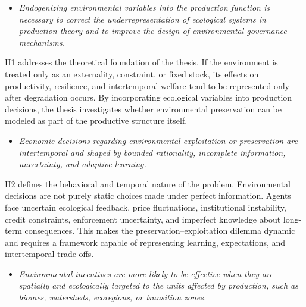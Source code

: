 \begin{itemize}

    \item[\textbf{H1.}]
    
    \textit{Endogenizing environmental variables into the production function is necessary to correct the underrepresentation of ecological systems in production theory and to improve the design of environmental governance mechanisms.}

\end{itemize}

H1 addresses the theoretical foundation of the thesis. If the environment is treated only as an externality, constraint, or fixed stock, its effects on productivity, resilience, and intertemporal welfare tend to be represented only after degradation occurs. By incorporating ecological variables into production decisions, the thesis investigates whether environmental preservation can be modeled as part of the productive structure itself.

\begin{itemize}

    \item[\textbf{H2.}]
    
    \textit{Economic decisions regarding environmental exploitation or preservation are intertemporal and shaped by bounded rationality, incomplete information, uncertainty, and adaptive learning.}

\end{itemize}

H2 defines the behavioral and temporal nature of the problem. Environmental decisions are not purely static choices made under perfect information. Agents face uncertain ecological feedback, price fluctuations, institutional instability, credit constraints, enforcement uncertainty, and imperfect knowledge about long-term consequences. This makes the preservation--exploitation dilemma dynamic and requires a framework capable of representing learning, expectations, and intertemporal trade-offs.

\begin{itemize}

    \item[\textbf{H3.}]
    
    \textit{Environmental incentives are more likely to be effective when they are spatially and ecologically targeted to the units affected by production, such as biomes, watersheds, ecoregions, or transition zones.}

\end{itemize}

